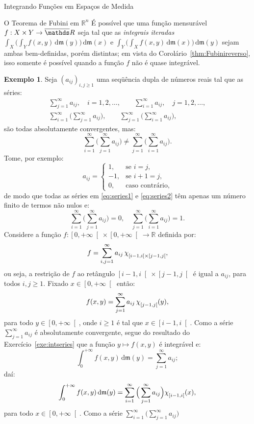 \documentclass[oneside,final,11pt]{amsbook}
\newcommand{\R}{\mathds R}
\newcommand{\leb}{\mathfrak m}
\newcommand{\dd}{\mathrm d}
\newcommand{\chilow}[1]{\chi_{\lower2pt\hbox{$\scriptstyle#1$}}}
\theoremstyle{remark}\newtheorem{exercise}{Exercício}[chapter]
\theoremstyle{remark}\newtheorem{*exercise}[exercise]{\hbox to 0pt{\hskip 0pt minus 1fil*}Exercício}
\theoremstyle{definition}\newtheorem{exdefin}{Definição}[chapter]
\theoremstyle{plain}\newtheorem{teo}{Teorema}[section]
\theoremstyle{plain}\newtheorem{lem}[teo]{Lema}
\theoremstyle{plain}\newtheorem{prop}[teo]{Proposição}
\theoremstyle{plain}\newtheorem{cor}[teo]{Corolário}
\theoremstyle{definition}\newtheorem{defin}[teo]{Definição}
\theoremstyle{remark}\newtheorem{rem}[teo]{Observação}
\theoremstyle{definition}\newtheorem{notation}[teo]{Notação}
\theoremstyle{definition}\newtheorem{convention}[teo]{Convenção}
\theoremstyle{definition}\newtheorem{example}[teo]{Exemplo}
\numberwithin{section}{chapter}
\numberwithin{equation}{section}
\begin{document}
\begin{chapter}{Integrando Funções em Espaços de Medida}
\begin{section}[O Teorema de Fubini em $\R^n$]{O Teorema de Fubini em ${\R^n}$}
É possível que uma função mensurável $f:X\times Y\to\overline\R$ seja tal que as {\em
integrais iteradas\/} $\int_X\big(\int_Yf(x,y)\,\dd\leb(y)\big)\,\dd\leb(x)$
e $\int_Y\big(\int_Xf(x,y)\,\dd\leb(x)\big)\,\dd\leb(y)$ sejam ambas bem-definidas,
porém distintas; em vista do Corolário~\ref{thm:Fubinireverso}, isso somente é possível
quando a função $f$ não é quase integrável.
\begin{example}
Seja $(a_{ij})_{i,j\ge1}$ uma seqüência dupla de números reais tal que as séries:
\begin{gather}
\sum_{j=1}^\infty a_{ij},\quad i=1,2,\ldots,\qquad
\sum_{i=1}^\infty a_{ij},\quad j=1,2,\ldots,\label{eq:series1}\\
\sum_{i=1}^\infty\Big(\sum_{j=1}^\infty a_{ij}\Big),\qquad
\sum_{j=1}^\infty\Big(\sum_{i=1}^\infty a_{ij}\Big),\label{eq:series2}
\end{gather}
são todas absolutamente convergentes, mas:
\[\sum_{i=1}^\infty\Big(\sum_{j=1}^\infty a_{ij}\Big)\ne\sum_{j=1}^\infty\Big(\sum_{i=1}^\infty a_{ij}\Big).\]
Tome, por exemplo:
\[a_{ij}=\begin{cases}
1,&\text{se $i=j$},\\
-1,&\text{se $i+1=j$},\\
0,&\text{caso contrário},
\end{cases}\]
de modo que todas as séries em \eqref{eq:series1} e \eqref{eq:series2}
têm apenas um número finito de termos não nulos e:
\[\sum_{i=1}^\infty\Big(\sum_{j=1}^\infty a_{ij}\Big)=0,\quad
\sum_{j=1}^\infty\Big(\sum_{i=1}^\infty a_{ij}\Big)=1.\]
Considere a função $f:\left[0,+\infty\right[\times\left[0,+\infty\right[\to\R$
definida por:
\[f=\sum_{i,j=1}^\infty a_{ij}\,\chilow{\left[i-1,i\right[\times\left[j-1,j\right[},\]
ou seja, a restrição de $f$ ao retângulo $\left[i-1,i\right[\times\left[j-1,j\right[$
é igual a $a_{ij}$, para todos $i,j\ge1$. Fixado $x\in\left[0,+\infty\right[$ então:
\[f(x,y)=\sum_{j=1}^\infty a_{ij}\,\chilow{\left[j-1,j\right[}(y),\]
para todo $y\in\left[0,+\infty\right[$, onde $i\ge1$ é tal que $x\in\left[i-1,i\right[$.
Como a série $\sum_{j=1}^\infty a_{ij}$ é absolutamente convergente, segue do
resultado do Exercício~\ref{exe:intseries} que a função $y\mapsto f(x,y)$ é integrável e:
\[\int_0^{+\infty}f(x,y)\,\dd\leb(y)=\sum_{j=1}^\infty a_{ij};\]
daí:
\[\int_0^{+\infty}f(x,y)\,\dd\leb(y)=\sum_{i=1}^\infty\Big(\sum_{j=1}^\infty a_{ij}\Big)
\chilow{\left[i-1,i\right[}(x),\]
para todo $x\in\left[0,+\infty\right[$. Como a série $\sum_{i=1}^\infty\big(\sum_{j=1}^\infty a_{ij}\big)$

\end{example}
\end{section}
\end{chapter}
\end{document}
